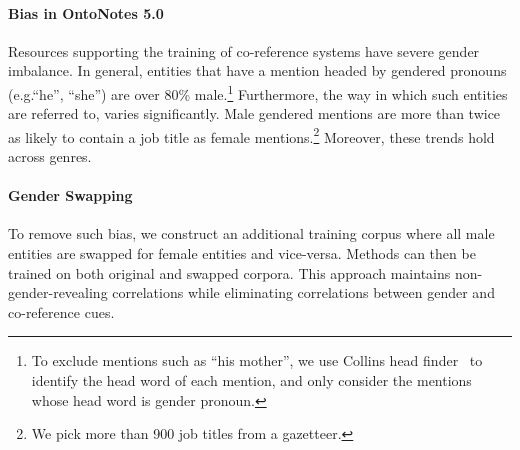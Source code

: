 \paragraph{Bias in OntoNotes 5.0}
Resources supporting the training of co-reference systems have severe gender imbalance. 
In general, entities that have a mention headed by gendered pronouns (e.g.``he'', ``she'') are over 80\% male.\footnote{To exclude mentions such as ``his mother'', we use Collins head finder~\cite{collins2003head} to identify the head word of each mention, and only consider the mentions whose head word is gender pronoun.}
Furthermore, the way in which such entities are referred to, varies significantly. 
Male gendered mentions are more than twice as likely to contain a job title as female mentions.\footnote{We pick more than  900 job titles from a gazetteer. %
}
Moreover, these trends hold across genres.

\vspace{-5pt}
\paragraph{Gender Swapping}
To remove such bias, we construct an additional training corpus where all male entities are swapped for female entities and vice-versa.
Methods can then be trained on both original and swapped corpora.
This approach maintains non-gender-revealing correlations while eliminating correlations between gender and co-reference cues.

